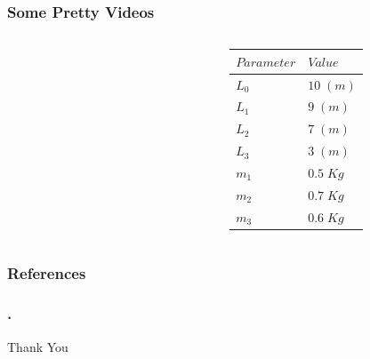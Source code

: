 \documentclass[10pt,aspectratio=169]{beamer}
\begin{document}
\begin{frame}
\frametitle{Some Pretty Videos}
\begin{columns}	
	\begin{column}{3cm}
		\centering
		\href{run:./figure/crankCrank1Forward.avi}{}	\\
		\href{run:./figure/crankRocker1Forward.avi}{}	\\
		\href{run:./figure/rockerCrank1Forward.avi}{}	\\
		\href{run:./figure/rockerRocker1Forward.avi}{}
	\end{column}
	\begin{column}{3cm}
		\centering
		\href{run:./figure/crankCrank2Forward.avi}{}	\\
		\href{run:./figure/crankRocker2Froward.avi}{}	\\
		\href{run:./figure/rockerCrank2Forward.avi}{}	\\
		\href{run:./figure/rockerRocker2Forward.avi}{}
	\end{column}
	\begin{column}{3cm}
		\begin{table}
			{\scriptsize 
				\begin{tabular}{ll}
					\hline
					$Parameter$ & $Value$ \\
					\hline
					$L_0$ & $10\; (m)$\\
					$L_1$ & $9 \; (m)$\\	
					$L_2$ & $7 \; (m)$\\
					$L_3$ & $3 \; (m)$\\
					$m_1$ & $0.5\; Kg$ \\	
					$m_2$ & $0.7\; Kg$\\
					$m_3$ & $0.6\; Kg$\\
					\hline
				\end{tabular}
			}
		\end{table}
	\end{column}
\end{columns}

\end{frame}


\begin{frame}
\frametitle{References}

{\footnotesize }
\end{frame}

\begin{frame}
\centering
\frametitle{.}
\LARGE{Thank You}\\
	
\end{frame}
\end{document}
